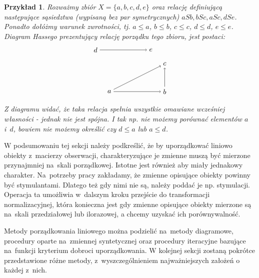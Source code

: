 \documentclass[12pt,a4paper]{report}
\newtheorem{example}{Przykład}
\begin{document}
\begin{example}
Rozważmy zbiór $X = \{a,b,c,d,e \}$ oraz relację definiującą następujące sąsiedztwa (wypisaną bez par symetrycznych) $aSb, bSc, aSc, dSe$. Ponadto dołóżmy warunek zwrotności, tj. $a \leq a$, $b \leq b$, $c \leq c$, $d \leq d$, $e \leq e$. Diagram Hassego prezentujący relację porządku tego zbioru, jest postaci:
$$
\begin{tikzpicture}[scale=.7]
  \node (a) at (-2,0) {$a$};
  \node (b) at (2,0) {$b$};
  \node (c) at (2,2) {$c$};
 \node (e) at (1,3) {$e$};
 \node (d) at (-3,3) {$d$};
	\draw [->] (d)--(e);
	\draw [->] (a)--(b);
	\draw [->] (a)--(c);
	\draw [->] (b)--(c);
\end{tikzpicture}
$$
Z diagramu widać, że taka relacja spełnia wszystkie omawiane wcześniej własności - jednak nie jest spójna. I tak np. nie możemy porównać elementów $a$ i~$d$, bowiem nie możemy określić czy  $d \leq a$ lub $a \leq d$.
\end{example}



W podsumowaniu tej sekcji należy podkreślić, że by uporządkować liniowo obiekty z~macierzy obserwacji, charakteryzujące je zmienne muszą być mierzone przynajmniej na~skali porządkowej. Istotne jest również aby miały jednakowy charakter. Na~potrzeby pracy zakładamy, że zmienne opisujące obiekty powinny być stymulantami. Dlatego też gdy nimi nie są, należy poddać je np. stymulacji. Operacja ta umożliwia w~dalszym kroku przejście do transformacji normalizacyjnej, która konieczna jest gdy zmienne opisujące obiekty mierzone są na~skali przedziałowej lub ilorazowej, a chcemy uzyskać ich porównywalność.

Metody porządkowania liniowego można podzielić na~metody diagramowe, procedury oparte na~zmiennej syntetycznej oraz procedury iteracyjne bazujące na~funkcji kryterium dobroci uporządkowania. %
W kolejnej sekcji zostaną pokrótce przedstawione różne metody, z~wyszczególnieniem najważniejszych założeń o każdej z~nich.
\end{document}
